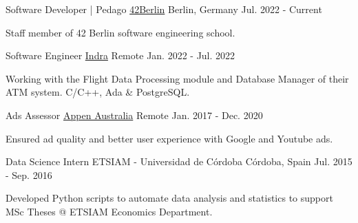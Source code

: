 

\begin{cventries}
  \cventry
    {Software Developer | Pedago}
    {\href{https://42berlin.de}{42Berlin}}
    {Berlin, Germany}
    {Jul. 2022 - Current}
     {
      \begin{cvitems}
        \item {Staff member of 42 Berlin software engineering school.}
      \end{cvitems}
    }

  \cventry
    {Software Engineer}
    {\href{https://www.indracompany.com/en/air-traffic-control-automation-system-0}{Indra}}
    {Remote}
    {Jan. 2022 - Jul. 2022}
     {
      \begin{cvitems}
        \item {Working with the Flight Data Processing module and Database Manager of their ATM system. C/C++, Ada \& PostgreSQL.}
      \end{cvitems}
    }


  \cventry
    {Ads Assessor}
    {\href{https://appen.com/}{Appen Australia}}
    {Remote}
    {Jan. 2017 - Dec. 2020}
     {
      \begin{cvitems}
        \item {Ensured ad quality and better user experience with Google and Youtube ads.}
      \end{cvitems}
    }

  \cventry
    {Data Science Intern}
    {ETSIAM - Universidad de Córdoba}
    {Córdoba, Spain}
    {Jul. 2015 - Sep. 2016}
     {
      \begin{cvitems}
        \item {Developed Python scripts to automate data analysis and statistics to support MSc Theses @ ETSIAM Economics Department.}
      \end{cvitems}
    }


\end{cventries}
